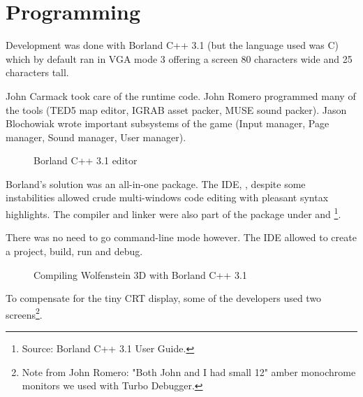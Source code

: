 \documentclass[book.tex]{subfiles}
\begin{document}
\section{Programming}



Development was done with Borland C++ 3.1 (but the language used was C) which by default ran in VGA mode 3 offering a screen 80 characters wide and 25 characters tall.\\
\par
John Carmack took care of the runtime code. John Romero programmed many of the tools (TED5 map editor, IGRAB asset packer, MUSE sound packer). Jason Blochowiak wrote important subsystems of the game (Input manager, Page manager, Sound manager, User manager).\\

\begin{figure}[H]
\centering
\caption{Borland C++ 3.1 editor}
\end{figure}
\par
Borland's solution was an all-in-one package. The IDE, , despite some instabilities allowed crude multi-windows code editing with pleasant syntax highlights. The compiler and linker were also part of the package under  and \footnote{Source: Borland C++ 3.1 User Guide.}.
\pagebreak


There was no need to go command-line mode however. The IDE allowed to create a project, build, run and debug.\\
\par
\begin{figure}[H]
\centering
  \caption{Compiling Wolfenstein 3D with Borland C++ 3.1}
\end{figure}





To compensate for the tiny CRT display, some of the developers used two screens\footnote{Note from John Romero: "Both John and I had small 12" amber monochrome monitors we used with Turbo Debugger.}.\\
\end{document}
